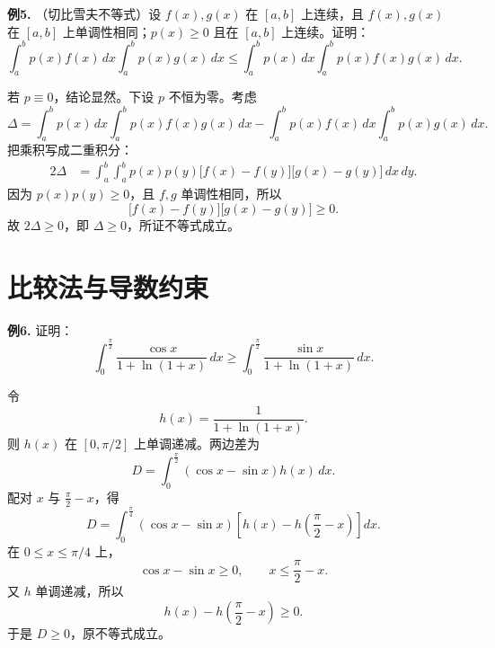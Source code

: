 \begin{problemblock}
\textbf{例5.} （切比雪夫不等式）设 \(f(x),g(x)\) 在 \([a,b]\) 上连续，且 \(f(x),g(x)\) 在 \([a,b]\) 上单调性相同；\(p(x)\ge0\) 且在 \([a,b]\) 上连续。证明：
\[
\int_a^bp(x)f(x)\,dx\int_a^bp(x)g(x)\,dx
\le
\int_a^bp(x)\,dx\int_a^bp(x)f(x)g(x)\,dx.
\]
\end{problemblock}
\begin{solutionblock}
若 \(p\equiv0\)，结论显然。下设 \(p\) 不恒为零。考虑
\[
\Delta=
\int_a^bp(x)\,dx\int_a^bp(x)f(x)g(x)\,dx
-\int_a^bp(x)f(x)\,dx\int_a^bp(x)g(x)\,dx.
\]
把乘积写成二重积分：
\[
\begin{aligned}
2\Delta
&=\int_a^b\int_a^b p(x)p(y)
\bigl[f(x)-f(y)\bigr]\bigl[g(x)-g(y)\bigr]\,dx\,dy.
\end{aligned}
\]
因为 \(p(x)p(y)\ge0\)，且 \(f,g\) 单调性相同，所以
\[
\bigl[f(x)-f(y)\bigr]\bigl[g(x)-g(y)\bigr]\ge0.
\]
故 \(2\Delta\ge0\)，即 \(\Delta\ge0\)，所证不等式成立。
\end{solutionblock}

\section{比较法与导数约束}

\begin{problemblock}
\textbf{例6.} 证明：
\[
\int_0^{\frac\pi2}\frac{\cos x}{1+\ln(1+x)}\,dx
\ge
\int_0^{\frac\pi2}\frac{\sin x}{1+\ln(1+x)}\,dx.
\]
\end{problemblock}
\begin{solutionblock}
令
\[
h(x)=\frac1{1+\ln(1+x)}.
\]
则 \(h(x)\) 在 \([0,\pi/2]\) 上单调递减。两边差为
\[
D=\int_0^{\frac\pi2}(\cos x-\sin x)h(x)\,dx.
\]
配对 \(x\) 与 \(\frac\pi2-x\)，得
\[
D=\int_0^{\frac\pi4}
(\cos x-\sin x)\left[h(x)-h\left(\frac\pi2-x\right)\right]dx.
\]
在 \(0\le x\le\pi/4\) 上，
\[
\cos x-\sin x\ge0,
\qquad
x\le\frac\pi2-x.
\]
又 \(h\) 单调递减，所以
\[
h(x)-h\left(\frac\pi2-x\right)\ge0.
\]
于是 \(D\ge0\)，原不等式成立。
\end{solutionblock}

